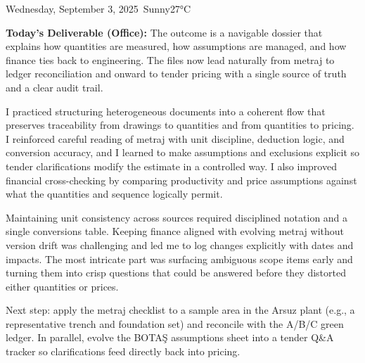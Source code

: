 \begin{dailyentry}{Wednesday, September 3, 2025}{\weathersunny\ Sunny}{27°C}
\begin{workcontent}
\textbf{Today’s Deliverable (Office):} The outcome is a navigable dossier that explains how quantities are measured, how assumptions are managed, and how finance ties back to engineering. The files now lead naturally from metraj to ledger reconciliation and onward to tender pricing with a single source of truth and a clear audit trail.
\end{workcontent}

\begin{skillslearned}
\item[] I practiced structuring heterogeneous documents into a coherent flow that preserves traceability from drawings to quantities and from quantities to pricing. I reinforced careful reading of metraj with unit discipline, deduction logic, and conversion accuracy, and I learned to make assumptions and exclusions explicit so tender clarifications modify the estimate in a controlled way. I also improved financial cross-checking by comparing productivity and price assumptions against what the quantities and sequence logically permit.
\end{skillslearned}

\begin{challenges}
\item[] Maintaining unit consistency across sources required disciplined notation and a single conversions table. Keeping finance aligned with evolving metraj without version drift was challenging and led me to log changes explicitly with dates and impacts. The most intricate part was surfacing ambiguous scope items early and turning them into crisp questions that could be answered before they distorted either quantities or prices.
\end{challenges}

\begin{dailynotes}
Next step: apply the metraj checklist to a sample area in the Arsuz plant (e.g., a representative trench and foundation set) and reconcile with the A/B/C green ledger. In parallel, evolve the BOTAŞ assumptions sheet into a tender Q\&A tracker so clarifications feed directly back into pricing.
\end{dailynotes}

\begin{approvalsection}
\end{approvalsection}

\end{dailyentry}
